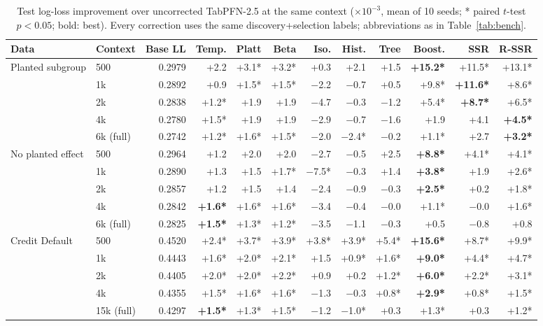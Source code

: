 \begin{table}[t]
\centering
\caption{Test log-loss improvement over uncorrected TabPFN-2.5 at the same context ($\times10^{-3}$, mean of 10 seeds; * paired $t$-test $p<0.05$; bold: best). Every correction uses the same discovery+selection labels; abbreviations as in Table~\ref{tab:bench}.}
\label{tab:gain}
\footnotesize\setlength{\tabcolsep}{4.5pt}
\begin{tabular}{llrrrrrrrrrr}
\toprule
Data & Context & Base LL & Temp. & Platt & Beta & Iso. & Hist. & Tree & Boost. & SSR & R-SSR \\
\midrule
\multirow{5}{*}{Planted subgroup} & 500 & 0.2979 & +2.2 & +3.1* & +3.2* & +0.3 & +2.1 & +1.5 & \textbf{+15.2*} & +11.5* & +13.1* \\
 & 1k & 0.2892 & +0.9 & +1.5* & +1.5* & $-$2.2 & $-$0.7 & +0.5 & +9.8* & \textbf{+11.6*} & +8.6* \\
 & 2k & 0.2838 & +1.2* & +1.9 & +1.9 & $-$4.7 & $-$0.3 & $-$1.2 & +5.4* & \textbf{+8.7*} & +6.5* \\
 & 4k & 0.2780 & +1.5* & +1.9 & +1.9 & $-$2.9 & $-$0.7 & $-$1.6 & +1.9 & +4.1 & \textbf{+4.5*} \\
 & 6k (full) & 0.2742 & +1.2* & +1.6* & +1.5* & $-$2.0 & $-$2.4* & $-$0.2 & +1.1* & +2.7 & \textbf{+3.2*} \\
\midrule
\multirow{5}{*}{No planted effect} & 500 & 0.2964 & +1.2 & +2.0 & +2.0 & $-$2.7 & $-$0.5 & +2.5 & \textbf{+8.8*} & +4.1* & +4.1* \\
 & 1k & 0.2890 & +1.3 & +1.5 & +1.7* & $-$7.5* & $-$0.3 & +1.4 & \textbf{+3.8*} & +1.9 & +2.6* \\
 & 2k & 0.2857 & +1.2 & +1.5 & +1.4 & $-$2.4 & $-$0.9 & $-$0.3 & \textbf{+2.5*} & +0.2 & +1.8* \\
 & 4k & 0.2842 & \textbf{+1.6*} & +1.6* & +1.6* & $-$3.4 & $-$0.4 & $-$0.0 & +1.1* & $-$0.0 & +1.6* \\
 & 6k (full) & 0.2825 & \textbf{+1.5*} & +1.3* & +1.2* & $-$3.5 & $-$1.1 & $-$0.3 & +0.5 & $-$0.8 & +0.8 \\
\midrule
\multirow{5}{*}{Credit Default} & 500 & 0.4520 & +2.4* & +3.7* & +3.9* & +3.8* & +3.9* & +5.4* & \textbf{+15.6*} & +8.7* & +9.9* \\
 & 1k & 0.4443 & +1.6* & +2.0* & +2.1* & +1.5 & +0.9* & +1.6* & \textbf{+9.0*} & +4.4* & +4.7* \\
 & 2k & 0.4405 & +2.0* & +2.0* & +2.2* & +0.9 & +0.2 & +1.2* & \textbf{+6.0*} & +2.2* & +3.1* \\
 & 4k & 0.4355 & +1.5* & +1.6* & +1.6* & $-$1.3 & $-$0.3 & +0.8* & \textbf{+2.9*} & +0.8* & +1.5* \\
 & 15k (full) & 0.4297 & \textbf{+1.5*} & +1.3* & +1.5* & $-$1.2 & $-$1.0* & +0.3 & +1.3* & +0.3 & +1.2* \\
\bottomrule
\end{tabular}
\end{table}
